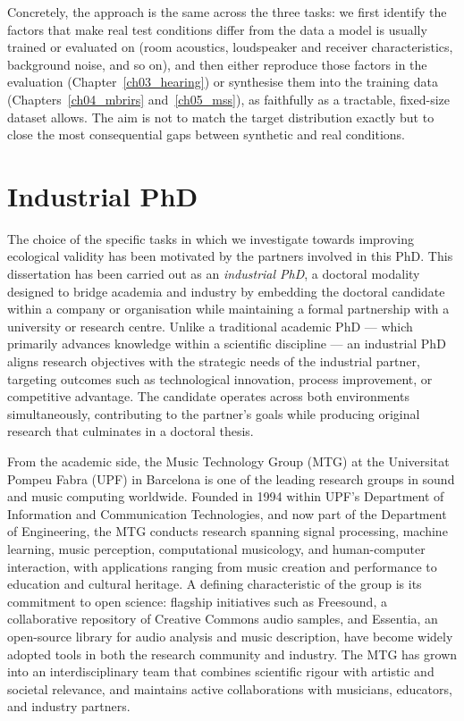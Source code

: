 Concretely, the approach is the same across the three tasks: we first identify the factors that make real test conditions differ from the data a model is usually trained or evaluated on (room acoustics, loudspeaker and receiver characteristics, background noise, and so on), and then either reproduce those factors in the evaluation (Chapter~\ref{ch03_hearing}) or synthesise them into the training data (Chapters~\ref{ch04_mbrirs} and~\ref{ch05_mss}), as faithfully as a tractable, fixed-size dataset allows. The aim is not to match the target distribution exactly but to close the most
consequential gaps between synthetic and real conditions.

\section{Industrial PhD}
\label{sec:industrial}

The choice of the specific tasks in which we investigate towards improving ecological validity has been motivated by the partners involved in this PhD. This dissertation has been carried out as an \emph{industrial PhD}, a doctoral modality designed to bridge academia and industry by embedding the doctoral candidate within a company or organisation while maintaining a formal partnership with a university or research centre. Unlike a traditional academic PhD — which primarily advances knowledge within a scientific discipline — an industrial PhD aligns research objectives with the strategic needs of the industrial partner, targeting outcomes such as technological innovation, process improvement, or competitive advantage. The candidate operates across both environments simultaneously, contributing to the partner's goals while producing original research that culminates in a doctoral thesis.

From the academic side, the Music Technology Group (MTG) at the Universitat Pompeu Fabra (UPF) in Barcelona is one of the leading research groups in sound and music computing worldwide. Founded in 1994 within UPF's Department of Information and Communication Technologies, and now part of the Department of Engineering, the MTG conducts research spanning signal processing, machine learning, music perception, computational musicology, and human-computer interaction, with applications ranging from music creation and performance to education and cultural heritage. A defining characteristic of the group is its commitment to open science: flagship initiatives such as Freesound, a collaborative repository of Creative Commons audio samples, and Essentia, an open-source library for audio analysis and music description, have become widely adopted tools in both the research community and industry. The MTG has grown into an interdisciplinary team that combines scientific rigour with artistic and societal relevance, and maintains active collaborations with musicians, educators, and industry partners.


